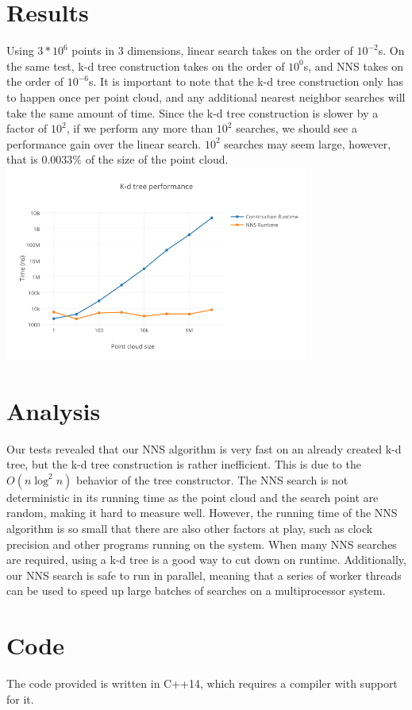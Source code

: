 \documentclass[a4paper,12pt,twocolumn]{article}
\begin{document}
\section{Results}
Using $3*10^6$ points in 3 dimensions, linear search takes on the order of $10^{-2}$s.
On the same test, k-d tree construction takes on the order of $10^0$s, and NNS takes
on the order of $10^{-6}$s.
It is important to note that the k-d tree construction only has to happen once per point
cloud, and any additional nearest neighbor searches will take the same amount of time.
Since the k-d tree construction is slower by a factor of $10^2$, if we perform any more
than $10^2$ searches, we should see a performance gain over the linear search.
$10^2$ searches may seem large, however, that is $0.0033\%$ of the size of the point cloud.
\includegraphics[width=10cm]{results.png}

\section{Analysis}
Our tests revealed that our NNS algorithm is very fast on an already created k-d tree, but
the k-d tree construction is rather inefficient.
This is due to the $O(n \log^2 n)$ behavior of the tree constructor.
The NNS search is not deterministic in its running time as the point cloud and the search
point are random, making it hard to measure well.
However, the running time of the NNS algorithm is so small that there are also other factors
at play, such as clock precision and other programs running on the system.
When many NNS searches are required, using a k-d tree is a good way to cut down on runtime.
Additionally, our NNS search is safe to run in parallel, meaning that a series of worker
threads can be used to speed up large batches of searches on a multiprocessor system.

\section{Code}
The code provided is written in C++14, which requires a compiler with support for it.
\end{document}
